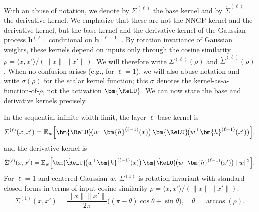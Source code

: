 With an abuse of notation, we denote by \( \Sigma^{(\ell)} \) the base kernel and by \( \dot{\Sigma}^{(\ell)} \) the derivative kernel. We emphasize that these are not the NNGP kernel and the derivative kernel, but the base kernel and the derivative kernel of the Gaussian process \( \bm{h}^{(\ell)} \) conditional on \( \bm{h}^{(\ell-1)} \).
By rotation invariance of Gaussian weights, these kernels depend on inputs only through the cosine similarity \(\rho=\langle x,x'\rangle/(\|x\|\,\|x'\|)\). We will therefore write \(\Sigma^{(\ell)}(\rho)\) and \(\dot{\Sigma}^{(\ell)}(\rho)\). When no confusion arises (e.g., for \(\ell=1\)), we will also abuse notation and write \(\sigma(\rho)\) for the scalar kernel function; this \(\sigma\) denotes the kernel-as-a-function-of-\(\rho\), not the activation \(\bm{\ReLU}\).
We can now state the base and derivative kernels precisely.
\begin{definition}\label{def:base-derivative-kernels}
\vspace{0.3cm}
In the sequential infinite-width limit, the layer-\( \ell \) base kernel is
\begin{equation}
\Sigma^{(\ell)}(x,x')
= \mathbb{E}_{w}\Big[\bm{\ReLU}\!\big(w^\top \bm{h}^{(\ell-1)}(x)\big)\,\bm{\ReLU}\!\big(w^\top \bm{h}^{(\ell-1)}(x')\big)\Big],
\end{equation}
and the derivative kernel is
\begin{equation}
\dot{\Sigma}^{(\ell)}(x,x')
= \mathbb{E}_{w}\Big[\dot{\bm{\ReLU}}\!\big(w^\top \bm{h}^{(\ell-1)}(x)\big)\,\dot{\bm{\ReLU}}\!\big(w^\top \bm{h}^{(\ell-1)}(x')\big)\;\|w\|^2\Big].
\end{equation}
For \( \ell=1 \) and centered Gaussian \( w \), \( \Sigma^{(1)} \) is rotation-invariant with standard closed forms in terms of input cosine similarity \( \rho = \langle x,x'\rangle/(\|x\|\|x'\|) \):
\[
\Sigma^{(1)}(x,x') = \frac{\|x\|\|x'\|}{2\pi}\big((\pi-\theta)\cos\theta + \sin\theta\big), \quad \theta = \arccos(\rho).
\]
\end{definition}


